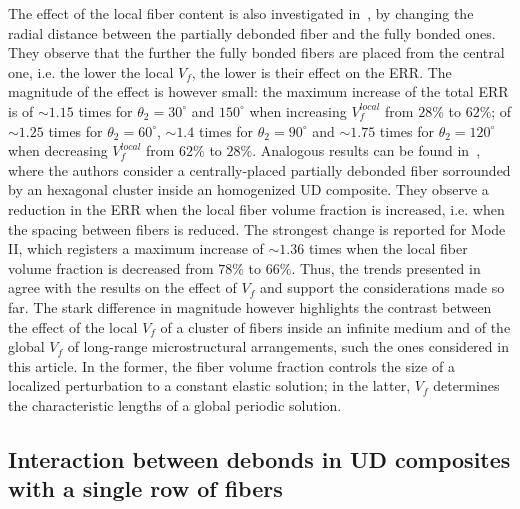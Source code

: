 \documentclass[review]{elsarticle}
\begin{document}
The effect of the local fiber content is also investigated in~\cite{Sandino2016}, by changing the radial distance between the partially debonded fiber and the fully bonded ones. They observe that the further the fully bonded fibers are placed from the central one, i.e. the lower the local $V_{f}$, the lower is their effect on the ERR. The magnitude of the effect is however small: the maximum increase of the total ERR is of $\sim1.15$ times for $\theta_{2}=30^{\circ}$ and $150^{\circ}$ when increasing $V_{f}^{local}$ from $28\%$ to $62\%$; of $\sim1.25$ times for $\theta_{2}=60^{\circ}$, $\sim1.4$ times for $\theta_{2}=90^{\circ}$ and $\sim1.75$ times for $\theta_{2}=120^{\circ}$ when decreasing $V_{f}^{local}$ from $62\%$ to $28\%$. Analogous results can be found in~\cite{Zhuang2018}, where the authors consider a centrally-placed partially debonded fiber sorrounded by an hexagonal cluster inside an homogenized UD composite. They observe a reduction in the ERR when the local fiber volume fraction is increased, i.e. when the spacing between fibers is reduced. The strongest change is reported for Mode II, which registers a maximum increase of $\sim1.36$ times when the local fiber volume fraction is decreased from $78\%$ to $66\%$. Thus, the trends presented in~\cite{Sandino2016,Zhuang2018} agree with the results on the effect of $V_{f}$ and support the considerations made so far. The stark difference in magnitude however highlights the contrast between the effect of the local $V_{f}$ of a cluster of fibers inside an infinite medium and of the global $V_{f}$ of long-range microstructural arrangements, such the ones considered in this article. In the former, the fiber volume fraction controls the size of a localized perturbation to a constant elastic solution; in the latter, $V_{f}$ determines the characteristic lengths of a global periodic solution.

\subsection{Interaction between debonds in UD composites with a single row of fibers}\label{subsec:singlefiberud}
\end{document}
